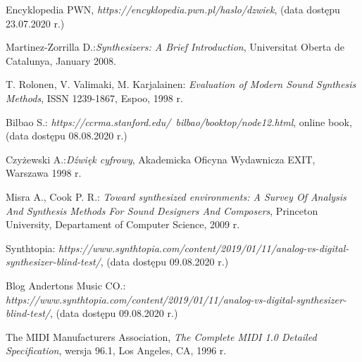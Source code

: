 \documentclass[nostrict]{szablonPG}
\begin{document}



	\setcounter{page}{3}
	\let\cleardoublepage\clearpage
	
	
	\tableofcontents    %
	
%	
	
	
	
	
	
	
	
	
	
%	
	
	

	\listoffigures      %
	\listoftables

	\begin{thebibliography}{20}                      %
		\small              %
		Encyklopedia PWN, \emph{https://encyklopedia.pwn.pl/haslo/dzwiek}, (data dostępu 23.07.2020 r.)
		
		Martinez-Zorrilla D.:\emph{Synthesizers: A Brief Introduction}, Universitat Oberta de Catalunya, January 2008.

		T. Rolonen, V. Valimaki, M. Karjalainen: \emph{Evaluation of Modern Sound Synthesis Methods}, ISSN 1239-1867, Espoo, 1998 r.

		Bilbao S.: \emph{https://ccrma.stanford.edu/~bilbao/booktop/node12.html}, online book, (data dostępu 08.08.2020 r.)
		
		 Czyżewski A.:\emph{Dźwięk cyfrowy}, Akademicka Oficyna Wydawnicza EXIT, Warszawa 1998 r.
		 
		 Misra A., Cook P. R.: \emph{Toward synthesized environments: A Survey Of Analysis And Synthesis Methods For Sound Designers And Composers}, Princeton University, Departament of Computer Science, 2009 r.
		
		Synthtopia: \emph{https://www.synthtopia.com/content/2019/01/11/analog-vs-digital-synthesizer-blind-test/}, (data dostępu 09.08.2020 r.)

		Blog Andertons Music CO.: \emph{https://www.synthtopia.com/content/2019/01/11/analog-vs-digital-synthesizer-blind-test/}, (data dostępu 09.08.2020 r.)
	
		The MIDI Manufacturers Association, \emph{The Complete MIDI 1.0 Detailed Specification}, wersja 96.1, Los Angeles, CA, 1996 r.
		

\end{thebibliography}
\end{document}
